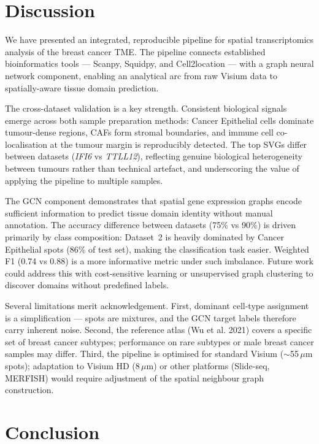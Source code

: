 \documentclass[12pt, a4paper]{article}
\begin{document}
\section{Discussion}

We have presented an integrated, reproducible pipeline for spatial
transcriptomics analysis of the breast cancer TME. The pipeline connects
established bioinformatics tools --- Scanpy, Squidpy, and Cell2location --- with
a graph neural network component, enabling an analytical arc from raw Visium
data to spatially-aware tissue domain prediction.

The cross-dataset validation is a key strength. Consistent biological signals
emerge across both sample preparation methods: Cancer Epithelial cells dominate
tumour-dense regions, CAFs form stromal boundaries, and immune cell co-localisation
at the tumour margin is reproducibly detected. The top SVGs differ between
datasets (\textit{IFI6} vs \textit{TTLL12}), reflecting genuine
biological heterogeneity between tumours rather than technical artefact, and
underscoring the value of applying the pipeline to multiple samples.

The GCN component demonstrates that spatial gene expression graphs encode
sufficient information to predict tissue domain identity without manual
annotation. The accuracy difference between datasets (75\% vs 90\%) is driven
primarily by class composition: Dataset~2 is heavily dominated by Cancer
Epithelial spots (86\% of test set), making the classification task easier.
Weighted F1 (0.74 vs 0.88) is a more informative metric under such imbalance.
Future work could address this with cost-sensitive learning or unsupervised
graph clustering \citep{kipf2017} to discover domains without predefined labels.

Several limitations merit acknowledgement. First, dominant cell-type assignment
is a simplification — spots are mixtures, and the GCN target labels therefore
carry inherent noise. Second, the reference atlas (Wu et al. 2021) covers a
specific set of breast cancer subtypes; performance on rare subtypes or
male breast cancer samples may differ. Third, the pipeline is optimised for
standard Visium ($\sim$55\,$\mu$m spots); adaptation to Visium HD (8\,$\mu$m)
or other platforms (Slide-seq, MERFISH) would require adjustment of the spatial
neighbour graph construction.

\section{Conclusion}
\end{document}
